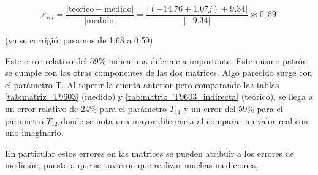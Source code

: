 







\[
\varepsilon_{rel} = \frac{|\text{teórico} - \text{medido}|}{|\text{medido}|} = \frac{|(-14.76 + 1.07j) + 9.34|}{|-9.34|} \approx 0,59
\] 

 (ya se corrigió, pasamos de 1,68 a 0,59)



Este error relativo del 59\% indica una diferencia importante. Este mismo patrón se cumple con las otras componentes de las dos matrices. Algo parecido surge con el parámetro T. Al repetir la cuenta anterior pero comparando las tablas \ref{tab:matriz_T9603} (medido) y \ref{tab:matriz_T9603_indirecta} (teórico), se llega a un error relativo de 24\% para el parámetro $T_{11}$ y un error del 59\% para el parametro $T_{12}$ donde se nota una mayor diferencia al comparar un valor real con uno imaginario. \par

En particular estos errores en las matrices se pueden atribuir a los errores de medición, puesto a que se tuvieron que realizar muchas mediciones, 











